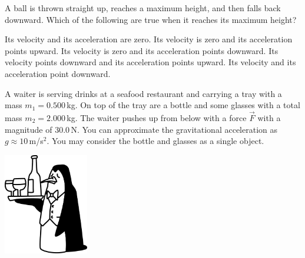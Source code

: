 \documentclass[letterpaper,addpoints,answers]{exam}
\begin{document}
\begin{questions}
\question[5]
A ball is thrown straight up, reaches a maximum height, and then falls back downward. Which of the following are true when it reaches its maximum height?
\begin{checkboxes}
 \choice Its velocity and its acceleration are zero.
 \choice Its velocity is zero and its acceleration points upward.
 \correctchoice Its velocity is zero and its acceleration points downward.
 \choice Its velocity points downward and its acceleration points upward.
 \choice Its velocity and its acceleration point downward.
\end{checkboxes}

\pagebreak

\begin{multicols}{2}
\question
A waiter is serving drinks at a seafood restaurant and carrying a tray with a mass $m_1 = 0.500$\,kg. On top of the tray are a bottle and some glasses with a total mass $m_2 = 2.000$\,kg. The waiter pushes up from below with a force $\vec{F}$ with a magnitude of 30.0\,N. You can approximate the gravitational acceleration as $g \approx 10$\,m/s$^2$. You may consider the bottle and glasses as a single object.
\columnbreak
\begin{center}
 \includegraphics[width=10em]{test1/illustration-of-a-penguin-waiter-serving-drinks-on-a-tray}
\end{center}
\end{multicols}
\end{questions}
\end{document}
